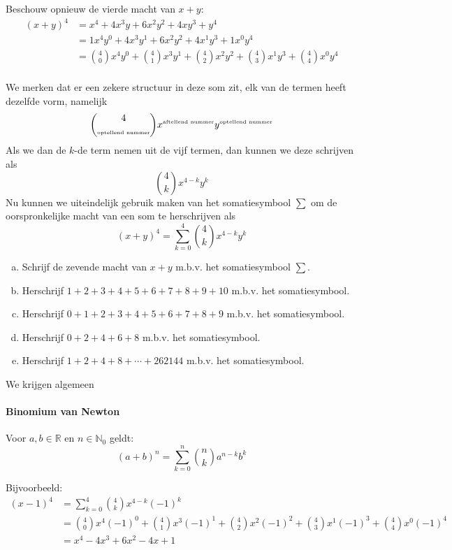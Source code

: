 \documentclass[12pt,a4paper,twoside]{article}
\begin{document}
Beschouw opnieuw de vierde macht van $x+y$:
\begin{align*}
  (x+y)^4 &= x^4 + 4x^3y+6x^2y^2+4xy^3+y^4\\
          &= 1x^4y^0 + 4x^3y^1+6x^2y^2+4x^1y^3+1x^0y^4\\
          &= {4 \choose 0}x^4y^0 + {4 \choose 1}x^3y^1+{4 \choose 2}x^2y^2+{4 \choose 3}x^1y^3+{4 \choose 4}x^0y^4\\
\end{align*}

We merken dat er een zekere structuur in deze som zit, elk van de termen heeft dezelfde vorm, namelijk
\[{4 \choose \mbox{\tiny{optellend nummer}}}x^{\mbox{{\tiny aftellend nummer}}}y^{\mbox{{\tiny optellend nummer}}}\]
Als we dan de $k$-de term nemen uit de vijf termen, dan kunnen we deze schrijven als
\[{4 \choose k}x^{4-k}y^{k}\]
Nu kunnen we uiteindelijk gebruik maken van het somatiesymbool $\sum$ om de oorspronkelijke macht van een som te herschrijven als
\[\left(x+y\right)^4 = \sum^4_{k=0}{4 \choose k}x^{4-k}y^{k}\]

\begin{oefening}
\begin{enumerate}[(a)]
\item Schrijf de zevende macht van $x+y$ m.b.v. het somatiesymbool
  $\sum$.
\item Herschrijf $1 + 2 + 3 + 4 + 5 + 6 + 7 + 8 + 9 + 10$ m.b.v. het somatiesymbool.
\item Herschrijf $0 + 1 + 2 + 3 + 4 + 5 + 6 + 7 + 8 + 9$ m.b.v. het somatiesymbool.
\item Herschrijf $0 + 2 + 4 + 6 + 8$ m.b.v. het somatiesymbool.
\item Herschrijf $1 + 2 + 4 + 8 + \cdots + 262144$ m.b.v. het somatiesymbool.
\end{enumerate}
\end{oefening}

\needspace{5cm}
We krijgen algemeen
\paragraph{Binomium van Newton}
\begin{mdframed}
Voor $a,b\in\mathbb{R}$ en $n\in\mathbb{N}_0$ geldt:
$$(a+b)^n=\sum^n_{k=0}{n \choose k}a^{n-k}b^k$$
\end{mdframed}

Bijvoorbeeld:
\begin{align*}\displaystyle
  (x-1)^4 &= \sum^4_{k=0}{4 \choose k}x^{4-k}(-1)^k\\
          &= {4 \choose 0}x^4(-1)^0 + {4 \choose 1}x^3(-1)^1+{4 \choose 2}x^2(-1)^2+{4 \choose 3}x^1(-1)^3+{4 \choose 4}x^0(-1)^4\\
          &=x^4-4x^3+6x^2-4x+1
\end{align*}
\end{document}

